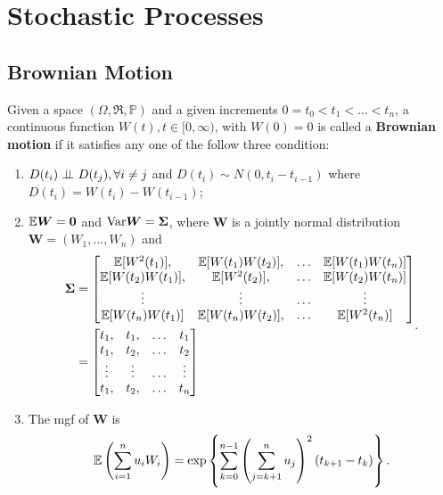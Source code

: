 \section{Stochastic Processes}

\subsection{Brownian Motion}
\begin{definition}\label{Definition:Brownian_motion}
Given a space $(\Omega,\mathfrak{R},\mathbb{P})$ and a given increments $0=t_0<t_1<\dots<t_n$, a continuous function $W(t),t\in[0,\infty)$, with $W(0)=0$ is called a \textbf{Brownian motion} if it satisfies any one of the follow three condition:
\begin{enumerate}
\item $D(t_i)\perp\!\!\!\perp D(t_j),\forall i\ne j$ and $D(t_i)\sim N(0,t_i-t_{i-1})$ where $D(t_i)=W(t_i)-W(t_{i-1})$;
\item $\mathbb{E} \boldsymbol{W} = \boldsymbol{0}$ and $\text{Var} \boldsymbol{W}=\boldsymbol{\Sigma}$, where $\boldsymbol{W}$ is a jointly normal distribution $\boldsymbol{W}=(W_1,\dots,W_n)$ and
\begin{equation}
\begin{aligned}
\boldsymbol{\Sigma}&=
\begin{bmatrix}
\mathbb{E} [W^2(t_1)], & \mathbb{E}[W(t_1)W(t_2)],&\dots &\mathbb{E}[W(t_1)W(t_n)]\\
\mathbb{E}[W(t_2)W(t_1)], &\mathbb{E} [W^2(t_2)], &\dots&\mathbb{E}[W(t_2)W(t_n)]\\
\vdots &\vdots &\dots & \vdots\\
\mathbb{E} [W(t_n)W(t_1)] &\mathbb{E}[W(t_n)W(t_2)], &\dots & \mathbb{E}[W^2(t_n)]
\end{bmatrix}\\
&=
\begin{bmatrix}
t_1, & t_1, &\dots & t_1\\
t_1, & t_2, &\dots & t_2\\
\vdots & \vdots & \dots & \vdots\\
t_1, & t_2, &\dots & t_n
\end{bmatrix}
\label{eq:brownian_cov_matrix}
\end{aligned}.
\end{equation}
\item The mgf of $\boldsymbol{W}$ is
\begin{equation}
\mathbb{E} \left(\sum_{i=1}^nu_iW_i\right)=\exp\left\{\sum_{k=0}^{n-1}\left(\sum_{j=k+1}^nu_j\right)^2(t_{k+1}-t_{k})\right\}.
\end{equation}
\end{enumerate}
\end{definition}

